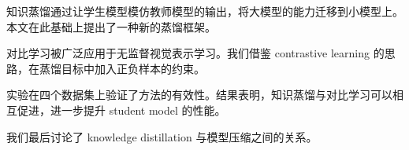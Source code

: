 知识蒸馏通过让学生模型模仿教师模型的输出，将大模型的能力迁移到小模型上。本文在此基础上提出了一种新的蒸馏框架。

对比学习被广泛应用于无监督视觉表示学习。我们借鉴 contrastive learning 的思路，在蒸馏目标中加入正负样本的约束。

实验在四个数据集上验证了方法的有效性。结果表明，知识蒸馏与对比学习可以相互促进，进一步提升 student model 的性能。

我们最后讨论了 knowledge distillation 与模型压缩之间的关系。
